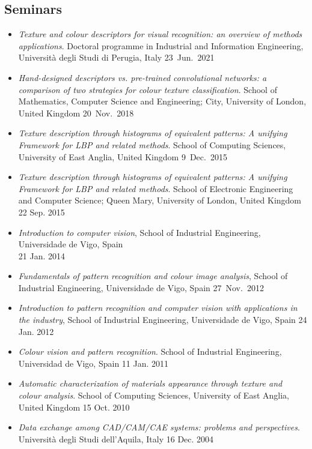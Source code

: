 \documentclass[11pt]{article}
\begin{document}
\subsection*{Seminars}

\begin{itemize}
	\item \emph{Texture and colour descriptors for visual recognition: an overview of methods applications}. Doctoral programme in Industrial and Information Engineering, Università degli Studi di Perugia, Italy \mbox{} \hfill 23~Jun.~2021
	\item \emph{Hand-designed descriptors vs. pre-trained convolutional networks: a comparison of two strategies for colour texture classification}. School of Mathematics, Computer Science and Engineering; City, University of London, United Kingdom \hfill 20~Nov.~2018
	\item \emph{Texture description through histograms of equivalent patterns: A unifying Framework for LBP and related methods}. School of Computing Sciences, University of East Anglia, United Kingdom \mbox{} \hfill 9~Dec.~2015
	\item \emph{Texture description through histograms of equivalent patterns: A unifying Framework for LBP and related methods}. School of Electronic Engineering and Computer Science; Queen Mary, University of London, United Kingdom \hfill 22 Sep. 2015
	\item \emph{Introduction to computer vision}, School of Industrial Engineering, Universidade de Vigo, Spain \\ \mbox{} \hfill 21 Jan. 2014
	\item \emph{Fundamentals of pattern recognition and colour image analysis}, School of Industrial Engineering, Universidade de Vigo, Spain \hfill 27~Nov.~2012
	\item \emph{Introduction to pattern recognition and computer vision with applications in the industry}, School of Industrial Engineering, Universidade de Vigo, Spain \hfill 24 Jan. 2012
	\item \emph{Colour vision and pattern recognition}. School of Industrial Engineering, Universidad de Vigo, Spain \hfill 11 Jan. 2011
	\item \emph{Automatic characterization of materials appearance through texture and colour analysis}. School of Computing Sciences, University of East Anglia, United Kingdom \hfill 15 Oct. 2010
	\item \emph{Data exchange among CAD/CAM/CAE systems: problems and perspectives}. Università degli Studi dell’Aquila, Italy \hfill 16 Dec. 2004
\end{itemize} 
\end{document}
